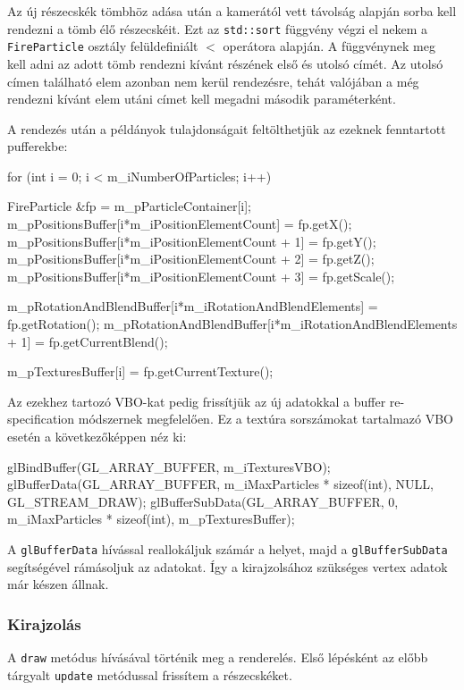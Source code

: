Az új részecskék tömbhöz adása után a kamerától vett távolság alapján sorba kell rendezni a tömb élő részecskéit. Ezt az \texttt{std::sort} függvény végzi el nekem a \texttt{FireParticle} osztály felüldefiniált $<$ operátora alapján. A függvénynek meg kell adni az adott tömb rendezni kívánt részének első és utolsó címét. Az utolsó címen található elem azonban nem kerül rendezésre, tehát valójában a még rendezni kívánt elem utáni címet kell megadni második paraméterként.

A rendezés után a példányok tulajdonságait feltölthetjük az ezeknek fenntartott pufferekbe:
\begin{cpp}
for (int i = 0; i < m_iNumberOfParticles; i++)
{
	FireParticle &fp = m_pParticleContainer[i];
	m_pPositionsBuffer[i*m_iPositionElementCount] = fp.getX();
	m_pPositionsBuffer[i*m_iPositionElementCount + 1] = fp.getY();
	m_pPositionsBuffer[i*m_iPositionElementCount + 2] = fp.getZ();
	m_pPositionsBuffer[i*m_iPositionElementCount + 3] = fp.getScale();

	m_pRotationAndBlendBuffer[i*m_iRotationAndBlendElements] = 
						fp.getRotation();
	m_pRotationAndBlendBuffer[i*m_iRotationAndBlendElements + 1] = 
						fp.getCurrentBlend();

	m_pTexturesBuffer[i] = fp.getCurrentTexture();
}
\end{cpp}
Az ezekhez tartozó VBO-kat pedig frissítjük az új adatokkal a buffer re-specification módszernek megfelelően. Ez a textúra sorszámokat tartalmazó VBO esetén a következőképpen néz ki:
\begin{cpp}
glBindBuffer(GL_ARRAY_BUFFER, m_iTexturesVBO);
glBufferData(GL_ARRAY_BUFFER, m_iMaxParticles * sizeof(int), 
			NULL, GL_STREAM_DRAW);
glBufferSubData(GL_ARRAY_BUFFER, 0, m_iMaxParticles * sizeof(int), 
			m_pTexturesBuffer);
\end{cpp}
A \texttt{glBufferData} hívással reallokáljuk számár a helyet, majd a \texttt{glBufferSubData} segítségével rámásoljuk az adatokat. Így a kirajzolsához szükséges vertex adatok már készen állnak.

\subsubsection{Kirajzolás}
A \texttt{draw} metódus hívásával történik meg a renderelés. Első lépésként az előbb tárgyalt \texttt{update} metódussal frissítem a részecskéket. 

